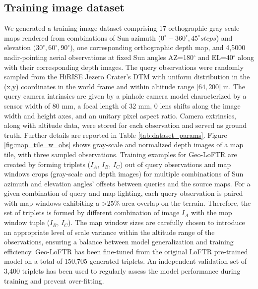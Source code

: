 
\subsection{Training image dataset}
\label{subsec:training_set}

We generated a training image dataset comprising 17 orthographic gray-scale maps rendered from combinations of Sun azimuth ($0^{\circ}-360^{\circ}, 45^{\circ} steps$) and elevation $(30^{\circ}, 60^{\circ}, 90^{\circ}$), one corresponding orthographic depth map, and 4,5000 nadir-pointing aerial observations at fixed Sun angles AZ=180$^{\circ}$ and EL=40$^{\circ}$ along with their corresponding depth images. The query observations were randomly sampled from the HiRISE Jezero Crater's DTM with uniform distribution in the (x,y) coordinates in the world frame and within altitude range [$64, 200$] m. The query camera intrinsics are given by a pinhole camera model characterized by a sensor width of 80 mm, a focal length of 32 mm, 0 lens shifts along the image width and height axes, and an unitary pixel aspect ratio. Camera extrinsics, along with altitude data, were stored for each observation and served as ground truth. Further details are reported in Table \ref{tab:dataset_params}. Figure \ref{fig:map_tile_w_obs} shows gray-scale and normalized depth images of a map tile, with three sampled observations. 
Training examples for Geo-LoFTR are created by forming triplets ($I_A$, $I_B$, $I_C$) out of query observations and map windows crops (gray-scale and depth images) for multiple combinations of Sun azimuth and elevation angles' offsets between queries and the source maps. For a given combination of query and map lighting, each query observation is paired with map windows exhibiting a >25\% area overlap on the terrain. Therefore, the set of triplets is formed by different combination of image $I_A$ with the mop window tuple ($I_B$, $I_C$). The map window sizes are carefully chosen to introduce an appropriate level of scale variance within the altitude range of the observations, ensuring a balance between model generalization and training efficiency. 
Geo-LoFTR has been fine-tuned from the original LoFTR pre-trained model on a total 
of 150,705 generated triplets. An independent validation set of 3,400 triplets has been used to regularly assess the model performance during training and prevent over-fitting. 

